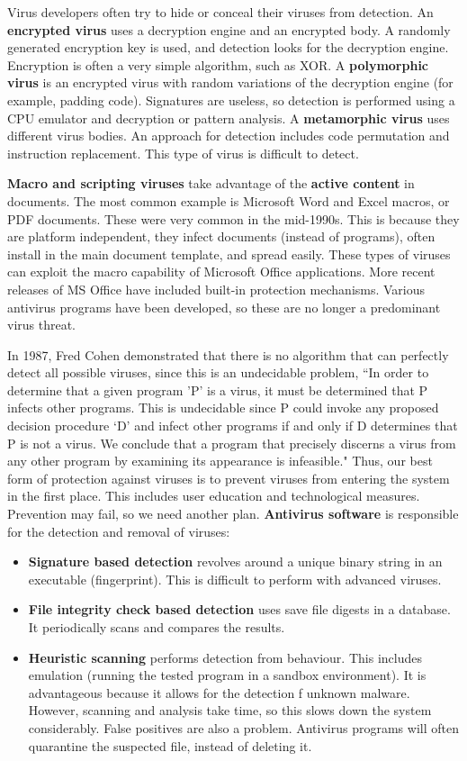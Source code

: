 \documentclass[11pt]{article}
\theoremstyle{plain} %
\theoremstyle{definition}
\theoremstyle{example}
\theoremstyle{remark}
\begin{document}
Virus developers often try to hide or conceal their viruses from detection. An \textbf{encrypted virus} uses a decryption engine and an encrypted body. A randomly generated encryption key is used, and detection looks for the decryption engine. Encryption is often a very simple algorithm, such as XOR. A \textbf{polymorphic virus} is an encrypted virus with random variations of the decryption engine (for example, padding code). Signatures are useless, so detection is performed using a CPU emulator and decryption or pattern analysis. A \textbf{metamorphic virus} uses different virus bodies. An approach for detection includes code permutation and instruction replacement. This type of virus is difficult to detect. 

\textbf{Macro and scripting viruses} take advantage of the \textbf{active content} in documents. The most common example is Microsoft Word and Excel macros, or PDF documents. These were very common in the mid-1990s. This is because they are platform independent, they infect documents (instead of programs), often install in the main document template, and spread easily. These types of viruses can exploit the macro capability of Microsoft Office applications. More recent releases of MS Office have included built-in protection mechanisms. Various antivirus programs have been developed, so these are no longer a predominant virus threat. 

In 1987, Fred Cohen demonstrated that there is no algorithm that can perfectly detect all possible viruses, since this is an undecidable problem, ``In order to determine that a given program 'P' is a virus, it must be determined that P infects other programs. This is undecidable since P could invoke any proposed decision procedure `D' and infect other programs if and only if D determines that P is not a virus. We conclude that a program that precisely discerns a virus from any other program by examining its appearance is infeasible." Thus, our best form of protection against viruses is to prevent viruses from entering the system in the first place. This includes user education and technological measures. Prevention may fail, so we need another plan. \textbf{Antivirus software} is responsible for the detection and removal of viruses:
\begin{itemize}
	\item \textbf{Signature based detection} revolves around a unique binary string in an executable (fingerprint). This is difficult to perform with advanced viruses.
	\item \textbf{File integrity check based detection} uses save file digests in a database. It periodically scans and compares the results. 
	\item \textbf{Heuristic scanning} performs detection from behaviour. This includes emulation (running the tested program in a sandbox environment). It is advantageous because it allows for the detection f unknown malware. However, scanning and analysis take time, so this slows down the system considerably. False positives are also a problem. Antivirus programs will often quarantine the suspected file, instead of deleting it. 
\end{itemize}
\end{document}
